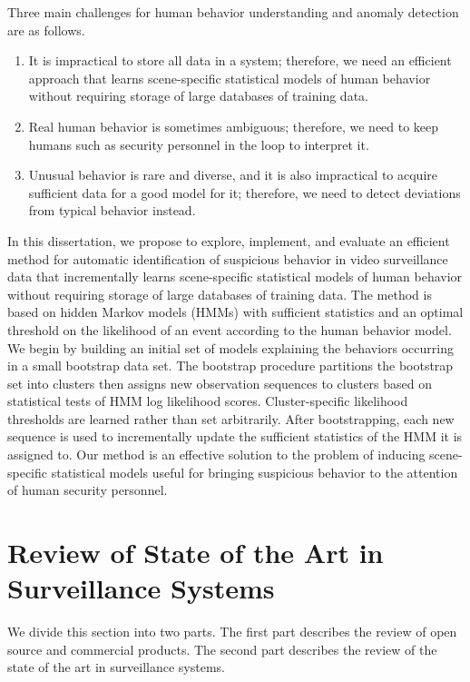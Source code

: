 Three main challenges for human behavior understanding and anomaly
detection are as follows.

\begin{enumerate}
    \item It is impractical to store all data in a system; therefore, we
        need an efficient approach that learns scene-specific statistical
        models of human behavior without requiring storage of large
        databases of training data.
    \item Real human behavior is sometimes ambiguous; therefore, we need to 
        keep humans such as security personnel in the loop to interpret it.
    \item Unusual behavior is rare and diverse, and it is also impractical 
        to acquire sufficient data for a good model for it; therefore, we 
        need to detect deviations from typical behavior instead.
\end{enumerate}

In this dissertation, we propose to explore, implement, and evaluate
an efficient method for automatic identification of suspicious
behavior in video surveillance data that incrementally learns
scene-specific statistical models of human behavior without requiring
storage of large databases of training data. The method is based on
hidden Markov models (HMMs) with sufficient statistics and an optimal
threshold on the likelihood of an event according to the human
behavior model.  We begin by building an initial set of models
explaining the behaviors occurring in a small bootstrap data set. The
bootstrap procedure partitions the bootstrap set into clusters then
assigns new observation sequences to clusters based on statistical
tests of HMM log likelihood scores. Cluster-specific likelihood
thresholds are learned rather than set arbitrarily. After
bootstrapping, each new sequence is used to incrementally update the
sufficient statistics of the HMM it is assigned to. Our method is an
effective solution to the problem of inducing scene-specific
statistical models useful for bringing suspicious behavior to the
attention of human security personnel.

\section{Review of State of the Art in Surveillance Systems}

We divide this section into two parts. The first part describes the 
review of open source and commercial products. The second part describes 
the review of the state of the art in surveillance systems.

